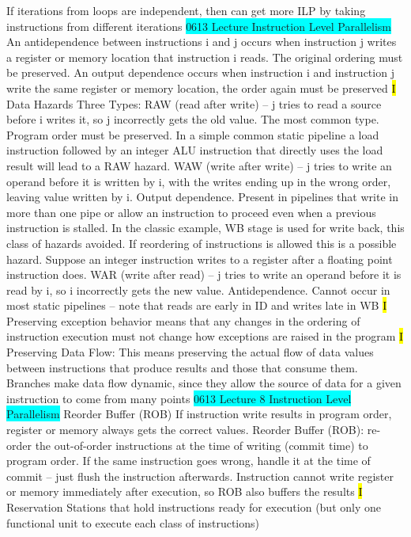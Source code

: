 \documentclass[fontsize=4pt]{scrartcl}
\begin{document}
If iterations from loops are independent, then can get more ILP by taking instructions from different iterations
\colorbox{Cyan}{0613 Lecture Instruction Level Parallelism} An antidependence between instructions i and j occurs when instruction j writes a register or memory location that instruction i reads.  The original ordering must be preserved. An output dependence occurs when instruction i and instruction j write the same register or memory location, the order again must be preserved
\hl{I}
Data Hazards Three Types: RAW (read after write) – j tries to read a source before i writes it, so j incorrectly gets the old value. The most common type. Program order must be preserved. In a simple common static pipeline a load instruction followed by an integer ALU instruction that directly uses the load result will lead to a RAW hazard. WAW (write after write) – j tries to write an operand before it is written by i, with the writes ending up in the wrong order, leaving value written by i. Output dependence. Present in pipelines that write in more than one pipe or allow an instruction to proceed even when a previous instruction is stalled. In the classic example, WB stage is used for write back, this class of hazards avoided. If reordering of instructions is allowed this is a possible hazard. Suppose an integer instruction writes to a register after a floating point instruction does. WAR (write after read) – j tries to write an operand before it is read by i, so i incorrectly gets the new value. Antidependence. Cannot occur in most static pipelines – note that reads are early in ID and writes late in WB
\hl{I}
Preserving exception behavior means that any changes in the ordering of instruction execution must not change how exceptions are raised in the program
\hl{I}
Preserving Data Flow: This means preserving the actual flow of data values between instructions  that produce results and those that consume them. Branches make data flow dynamic, since they allow the source of data for a given instruction to come from many points  
\colorbox{Cyan}{0613 Lecture 8 Instruction Level Parallelism} Reorder Buffer (ROB) If instruction write results in program order, register or memory always gets the correct values. Reorder Buffer (ROB): re-order the out-of-order instructions at the time of writing (commit time) to program order. If the same instruction goes wrong, handle it at the time of commit – just flush the instruction afterwards. Instruction cannot write register or memory immediately after execution, so ROB also buffers the results
\hl{I}
Reservation Stations that hold instructions ready for execution (but only one functional unit to execute each class of instructions)
\end{document}
